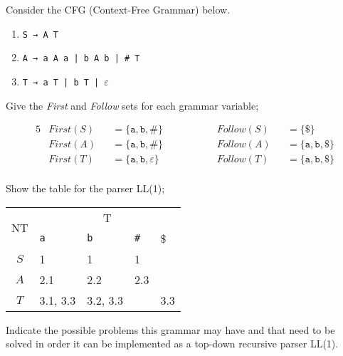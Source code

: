 \documentclass[docid=2017]{comp_test1}
\begin{document}
\setcounter{chapter}{2016}


Consider the CFG (Context-Free Grammar) below.

\begin{enumerate}
    \item \texttt{S → A T}
    \item \texttt{A → a A a | b A b | \# T}
    \item \texttt{T → a T | b T | $\varepsilon$}
\end{enumerate}

\question
Give the \textit{First} and \textit{Follow} sets for each grammar variable;

\ansseparator

\vspace{-2.0em}
\begin{alignat*}{5}
    & First (S) &&= \{ \texttt{a}, \texttt{b}, \texttt{\#} \} && ~~~~~~~~~~ && Follow(S) &&= \{ \$                         \} \\
    & First (A) &&= \{ \texttt{a}, \texttt{b}, \texttt{\#} \} && ~~~~~~~~~~ && Follow(A) &&= \{ \texttt{a}, \texttt{b}, \$ \} \\
    & First (T) &&= \{ \texttt{a}, \texttt{b}, \varepsilon \} && ~~~~~~~~~~ && Follow(T) &&= \{ \texttt{a}, \texttt{b}, \$ \} \\
\end{alignat*}
\vspace{-3.0em}

\question
Show the table for the parser LL(1);

\ansseparator

\begin{center}
    \small
    \begin{tabular}{@{} c | p{33mm} | p{33mm} | p{33mm} | p{33mm} @{}}
        \multirow{2}{*}{NT} & \multicolumn{4}{c}{T} \\ \cline{2-5}
        & \texttt{a} & \texttt{b} & \texttt{\#} & \$ \\ \hline
        $S$ & 1 & 1 & 1 &  \\ \hline
        $A$ & 2.1 & 2.2 & 2.3 &  \\ \hline
        $T$ & 3.1, 3.3 & 3.2, 3.3 &   & 3.3
    \end{tabular}
\end{center}

\question
Indicate the possible problems this grammar may have and that need to be solved in order it can be implemented as a top-down recursive parser LL(1).
\end{document}
